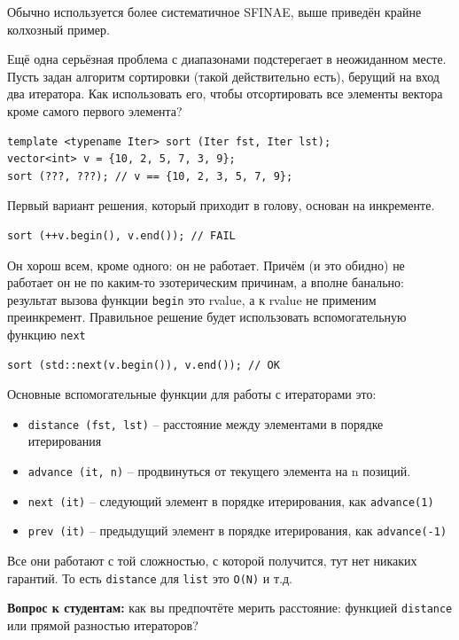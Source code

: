 \documentclass[a4paper,12pt,oneside]{book}
\begin{document}
Обычно используется более систематичное SFINAE, выше приведён крайне колхозный пример.

Ещё одна серьёзная проблема с диапазонами подстерегает в неожиданном месте. Пусть задан алгоритм сортировки (такой действительно есть), берущий на вход два итератора. Как использовать его, чтобы отсортировать все элементы вектора кроме самого первого элемента?

\begin{lstlisting}
template <typename Iter> sort (Iter fst, Iter lst);
vector<int> v = {10, 2, 5, 7, 3, 9};
sort (???, ???); // v == {10, 2, 3, 5, 7, 9};
\end{lstlisting}

Первый вариант решения, который приходит в голову, основан на инкременте.

\begin{lstlisting}
sort (++v.begin(), v.end()); // FAIL
\end{lstlisting}

Он хорош всем, кроме одного: он не работает. Причём (и это обидно) не работает он не по каким-то эзотерическим причинам, а вполне банально: результат вызова функции \lstinline!begin! это rvalue, а к rvalue не применим преинкремент. Правильное решение будет использовать вспомогательную функцию \lstinline!next!

\begin{lstlisting}
sort (std::next(v.begin()), v.end()); // OK
\end{lstlisting}

Основные вспомогательные функции для работы с итераторами это:

\begin{itemize}
\item \lstinline!distance (fst, lst)! – расстояние между элементами в порядке итерирования
\item \lstinline!advance (it, n)! – продвинуться от текущего элемента на n позиций.
\item \lstinline!next (it)! – следующий элемент в порядке итерирования, как \lstinline!advance(1)!
\item \lstinline!prev (it)! – предыдущий элемент в порядке итерирования, как \lstinline!advance(-1)!
\end{itemize}

Все они работают с той сложностью, с которой получится, тут нет никаких гарантий. То есть \lstinline!distance! для \lstinline!list! это \lstinline!O(N)! и т.д.

\textbf{Вопрос к студентам:} как вы предпочтёте мерить расстояние: функцией \lstinline!distance! или прямой разностью итераторов?
\end{document}
